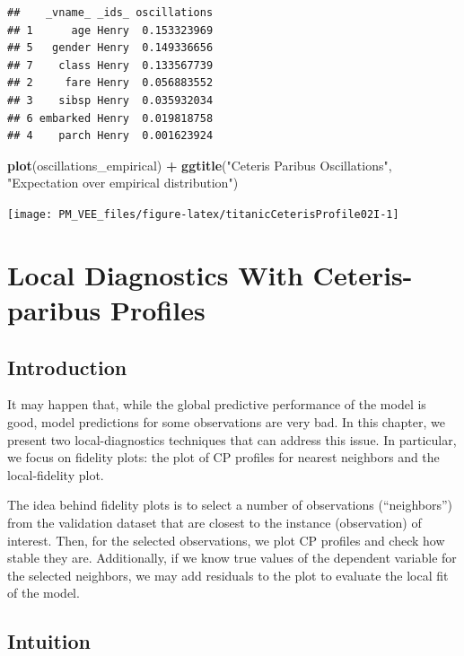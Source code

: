 \documentclass[12pt,]{krantz}
\newenvironment{Shaded}{\begin{snugshade}}{\end{snugshade}}
\newcommand{\KeywordTok}[1]{\textcolor[rgb]{0.13,0.29,0.53}{\textbf{#1}}}
\newcommand{\NormalTok}[1]{#1}
\newcommand{\OperatorTok}[1]{\textcolor[rgb]{0.81,0.36,0.00}{\textbf{#1}}}
\newcommand{\StringTok}[1]{\textcolor[rgb]{0.31,0.60,0.02}{#1}}
\begin{document}
\begin{verbatim}
##    _vname_ _ids_ oscillations
## 1      age Henry  0.153323969
## 5   gender Henry  0.149336656
## 7    class Henry  0.133567739
## 2     fare Henry  0.056883552
## 3    sibsp Henry  0.035932034
## 6 embarked Henry  0.019818758
## 4    parch Henry  0.001623924
\end{verbatim}

\begin{Shaded}
\begin{Highlighting}[]
\KeywordTok{plot}\NormalTok{(oscillations_empirical) }\OperatorTok{+}\StringTok{ }\KeywordTok{ggtitle}\NormalTok{(}\StringTok{"Ceteris Paribus Oscillations"}\NormalTok{, }\StringTok{"Expectation over empirical distribution"}\NormalTok{)}
\end{Highlighting}
\end{Shaded}

\begin{center}\texttt{[image: PM\_VEE\_files/figure-latex/titanicCeterisProfile02I-1]} \end{center}

\hypertarget{localDiagnostics}{%
\section{Local Diagnostics With Ceteris-paribus Profiles}\label{localDiagnostics}}

\hypertarget{cPLocDiagIntro}{%
\subsection{Introduction}\label{cPLocDiagIntro}}

It may happen that, while the global predictive performance of the model is good, model predictions for some observations are very bad. In this chapter, we present two local-diagnostics techniques that can address this issue. In particular, we focus on fidelity plots: the plot of CP profiles for nearest neighbors and the local-fidelity plot.

The idea behind fidelity plots is to select a number of observations (``neighbors'') from the validation dataset that are closest to the instance (observation) of interest. Then, for the selected observations, we plot CP profiles and check how stable they are. Additionally, if we know true values of the dependent variable for the selected neighbors, we may add residuals to the plot to evaluate the local fit of the model.

\hypertarget{cPLocDiagIntuition}{%
\subsection{Intuition}\label{cPLocDiagIntuition}}
\end{document}
